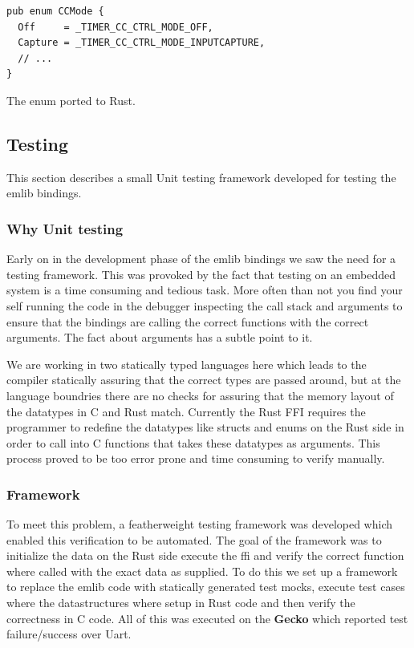 \begin{listing}[h]
\begin{verbatim}
pub enum CCMode {
  Off     = _TIMER_CC_CTRL_MODE_OFF,
  Capture = _TIMER_CC_CTRL_MODE_INPUTCAPTURE,
  // ...
}
\end{verbatim}
\caption{The enum ported to Rust.}
\label{lst:enum_naming_rust}
\end{listing}

\subsection{Testing}
\label{ssub:testing}

This section describes a small Unit testing framework developed for testing the emlib bindings.

\subsubsection{Why Unit testing}

Early on in the development phase of the emlib bindings we saw the need for a testing framework.
This was provoked by the fact that testing on an embedded system is a time consuming and tedious task.
More often than not you find your self running the code in the debugger inspecting the call stack and arguments to ensure that the bindings are calling the correct functions with the correct arguments.
The fact about arguments has a subtle point to it.

We are working in two statically typed languages here which leads to the compiler statically assuring that the correct types are passed around, but at the language boundries there are no checks for assuring that the memory layout of the datatypes in C and Rust match.
Currently the Rust FFI requires the programmer to redefine the datatypes like structs and enums on the Rust side in order to call into C functions that takes these datatypes as arguments.
This process proved to be too error prone and time consuming to verify manually.

\subsubsection{Framework}

To meet this problem, a featherweight testing framework was developed which enabled this verification to be automated.
The goal of the framework was to initialize the data on the Rust side execute the \gls{ffi} and verify the correct function where called with the exact data as supplied.
To do this we set up a framework to replace the emlib code with statically generated test mocks, execute test cases where the datastructures where setup in Rust code and then verify the correctness in C code.
All of this was executed on the \textbf{Gecko} which reported test failure/success over Uart.

